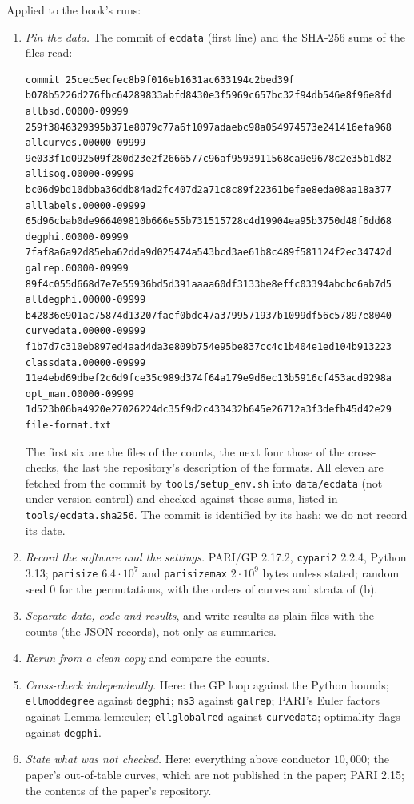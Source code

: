 \begin{sloppypar}
\begin{convention}\label{conv:computation:checklist}
Applied to the book's runs:
\begin{enumerate}[label=(\arabic*)]
\item \emph{Pin the data.} The commit of \texttt{ecdata} (first line) and the SHA-256 sums of the files read:
\begin{lstlisting}[basicstyle=\ttfamily\scriptsize]
commit 25cec5ecfec8b9f016eb1631ac633194c2bed39f
b078b5226d276fbc64289833abfd8430e3f5969c657bc32f94db546e8f96e8fd  allbsd.00000-09999
259f3846329395b371e8079c77a6f1097adaebc98a054974573e241416efa968  allcurves.00000-09999
9e033f1d092509f280d23e2f2666577c96af9593911568ca9e9678c2e35b1d82  allisog.00000-09999
bc06d9bd10dbba36ddb84ad2fc407d2a71c8c89f22361befae8eda08aa18a377  alllabels.00000-09999
65d96cbab0de966409810b666e55b731515728c4d19904ea95b3750d48f6dd68  degphi.00000-09999
7faf8a6a92d85eba62dda9d025474a543bcd3ae61b8c489f581124f2ec34742d  galrep.00000-09999
89f4c055d668d7e7e55936bd5d391aaaa60df3133be8effc03394abcbc6ab7d5  alldegphi.00000-09999
b42836e901ac75874d13207faef0bdc47a3799571937b1099df56c57897e8040  curvedata.00000-09999
f1b7d7c310eb897ed4aad4da3e809b754e95be837cc4c1b404e1ed104b913223  classdata.00000-09999
11e4ebd69dbef2c6d9fce35c989d374f64a179e9d6ec13b5916cf453acd9298a  opt_man.00000-09999
1d523b06ba4920e27026224dc35f9d2c433432b645e26712a3f3defb45d42e29  file-format.txt
\end{lstlisting}
The first six are the files of the counts, the next four those of the cross-checks, the last the repository's description of the formats. All
eleven are fetched from the commit by \texttt{tools/setup\_env.sh} into \texttt{data/ecdata} (not under version control) and checked against
these sums, listed in \texttt{tools/ecdata.sha256}. The commit is identified by its hash; we do not record its date.
\item \emph{Record the software and the settings.} PARI/GP 2.17.2, \texttt{cypari2} 2.2.4, Python 3.13; \texttt{parisize} $6.4\cdot10^7$ and \texttt{parisizemax} $2\cdot10^9$
bytes unless stated; random seed $0$ for the permutations, with the orders of curves and strata of (b).
\item \emph{Separate data, code and results}, and write results as plain files with the counts (the JSON records), not only as summaries.
\item \emph{Rerun from a clean copy} and compare the counts.
\item \emph{Cross-check independently.} Here: the GP loop against the Python bounds; \texttt{ellmoddegree} against \texttt{degphi}; \texttt{ns3} against
\texttt{galrep}; PARI's Euler factors against Lemma lem:euler; \texttt{ellglobalred} against \texttt{curvedata}; optimality flags against \texttt{degphi}.
\item \emph{State what was not checked.} Here: everything above conductor $10{,}000$; the paper's out-of-table curves, which are not published in the
paper; PARI 2.15; the contents of the paper's repository.
\end{enumerate}
\end{convention}


\end{sloppypar}
